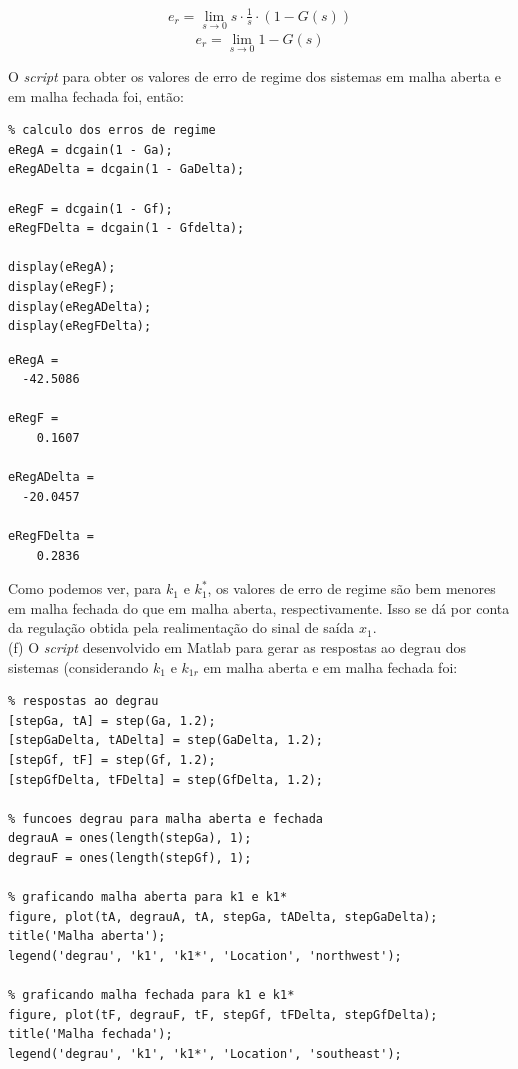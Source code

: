 \documentclass[a4paper,11pt]{article}
\begin{document}
\begin{gather*}
    e_r = \lim_{s\to0} s \cdot \frac{1}{s} \cdot
        \left(1 - G\left(s\right)\right)
\end{gather*}
\begin{equation} \label{eq:erro-de-reg}
    e_r = \lim_{s\to0} 1 - G\left(s\right)
\end{equation}

O \textit{script} para obter os valores de erro de regime dos sistemas em malha
aberta e em malha fechada foi, então:

\begin{lstlisting}
% calculo dos erros de regime
eRegA = dcgain(1 - Ga);
eRegADelta = dcgain(1 - GaDelta);

eRegF = dcgain(1 - Gf);
eRegFDelta = dcgain(1 - Gfdelta);

display(eRegA);
display(eRegF);
display(eRegADelta);
display(eRegFDelta);
\end{lstlisting}

\begin{lstlisting}
eRegA =
  -42.5086

eRegF =
    0.1607

eRegADelta =
  -20.0457

eRegFDelta =
    0.2836
\end{lstlisting}

Como podemos ver, para $k_1$ e $k_1^\ast$, os valores de erro de regime são
bem menores em malha fechada do que em malha aberta, respectivamente.
Isso se dá por conta da regulação obtida pela realimentação do sinal de saída
$x_1$. \\

(f) O \textit{script} desenvolvido em Matlab para gerar as respostas ao degrau
dos sistemas (considerando $k_1$ e $k_{1r}$ em malha aberta e em malha fechada
foi:

\begin{lstlisting}
% respostas ao degrau
[stepGa, tA] = step(Ga, 1.2);
[stepGaDelta, tADelta] = step(GaDelta, 1.2);
[stepGf, tF] = step(Gf, 1.2);
[stepGfDelta, tFDelta] = step(GfDelta, 1.2);

% funcoes degrau para malha aberta e fechada
degrauA = ones(length(stepGa), 1);
degrauF = ones(length(stepGf), 1);

% graficando malha aberta para k1 e k1*
figure, plot(tA, degrauA, tA, stepGa, tADelta, stepGaDelta);
title('Malha aberta');
legend('degrau', 'k1', 'k1*', 'Location', 'northwest');

% graficando malha fechada para k1 e k1*
figure, plot(tF, degrauF, tF, stepGf, tFDelta, stepGfDelta);
title('Malha fechada');
legend('degrau', 'k1', 'k1*', 'Location', 'southeast');
\end{lstlisting}
\end{document}
